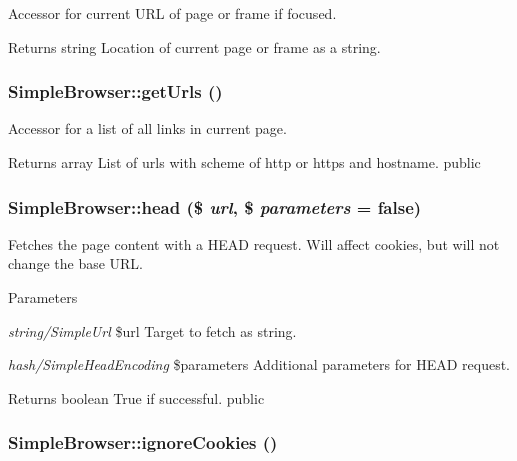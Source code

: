 \label{class_simple_browser_a92cdd5a8dc1a7b29ca064bb3f29ad63d}
Accessor for current URL of page or frame if focused. \begin{DoxyReturn}{Returns}
string Location of current page or frame as a string. 
\end{DoxyReturn}
\hypertarget{class_simple_browser_a876a4e02d4782993282e90aa97c3eabf}{
\subsubsection[{getUrls}]{\setlength{\rightskip}{0pt plus 5cm}SimpleBrowser::getUrls ()}}
\label{class_simple_browser_a876a4e02d4782993282e90aa97c3eabf}
Accessor for a list of all links in current page. \begin{DoxyReturn}{Returns}
array List of urls with scheme of http or https and hostname.  public 
\end{DoxyReturn}
\hypertarget{class_simple_browser_aff49ab3df60d3613fdc7a36bd7755f13}{
\subsubsection[{head}]{\setlength{\rightskip}{0pt plus 5cm}SimpleBrowser::head (\$ {\em url}, \/  \$ {\em parameters} = {\ttfamily false})}}
\label{class_simple_browser_aff49ab3df60d3613fdc7a36bd7755f13}
Fetches the page content with a HEAD request. Will affect cookies, but will not change the base URL. 
\begin{DoxyParams}{Parameters}
\item[{\em string/SimpleUrl}]\$url Target to fetch as string. \item[{\em hash/SimpleHeadEncoding}]\$parameters Additional parameters for HEAD request. \end{DoxyParams}
\begin{DoxyReturn}{Returns}
boolean True if successful.  public 
\end{DoxyReturn}
\hypertarget{class_simple_browser_a116178a0d8efe15140f1fdfd53cd8d3c}{
\subsubsection[{ignoreCookies}]{\setlength{\rightskip}{0pt plus 5cm}SimpleBrowser::ignoreCookies ()}}
